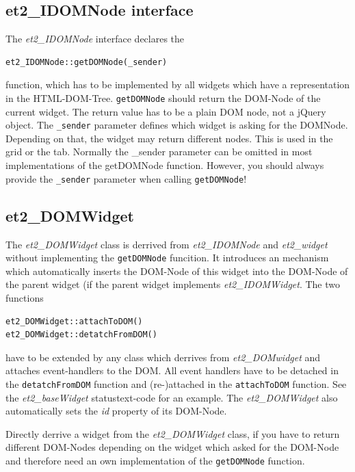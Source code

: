 \documentclass[10pt,a4paper]{report}
\begin{document}
\subsection*{et2\_IDOMNode interface}
The \textit{et2\_IDOMNode} interface declares the
\begin{verbatim}
et2_IDOMNode::getDOMNode(_sender)
\end{verbatim}
function, which has to be implemented by all widgets which have a representation in the HTML-DOM-Tree. \texttt{getDOMNode} should return the DOM-Node of the current widget. The return value has to be a plain DOM node, not a jQuery object. The \texttt{\_sender} parameter defines which widget is asking for the DOMNode. Depending on that, the widget may return different nodes. This is used in the grid or the tab. Normally the \_sender parameter can be omitted in most implementations of the getDOMNode function. However, you should always provide the \texttt{\_sender} parameter when calling \texttt{getDOMNode}!

\subsection*{et2\_DOMWidget}
The \textit{et2\_DOMWidget} class is derrived from \textit{et2\_IDOMNode} and \textit{et2\_widget} without implementing the \texttt{getDOMNode} funcition. It  introduces an mechanism which automatically inserts the DOM-Node of this widget into the DOM-Node of the parent widget (if the parent widget implements \textit{et2\_IDOMWidget}. The two functions
\begin{verbatim}
et2_DOMWidget::attachToDOM()
et2_DOMWidget::detatchFromDOM()
\end{verbatim}
have to be extended by any class which derrives from \textit{et2\_DOMwidget} and attaches event-handlers to the DOM. All event handlers have to be detached in the \texttt{detatchFromDOM} function and (re-)attached in the \texttt{attachToDOM} function. See the \textit{et2\_baseWidget} statustext-code for an example. The \textit{et2\_DOMWidget} also automatically sets the \textit{id} property of its DOM-Node.

Directly derrive a widget from the \textit{et2\_DOMWidget} class, if you have to return different DOM-Nodes depending on the widget which asked for the DOM-Node and therefore need an own implementation of the \texttt{getDOMNode} function.
\end{document}
